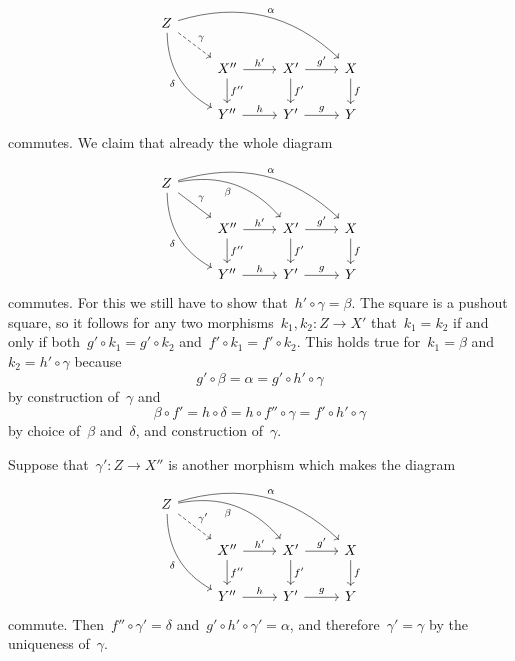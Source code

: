 \[
  \begin{tikzcd}
      Z
      \arrow[bend left]{drrr}[above right]{\alpha}
      \arrow[dashed]{dr}[above right]{\gamma}
      \arrow[bend right]{ddr}[below left]{\delta}
    & {}
    & {}
    & {}
    \\
      {}
    & X''
      \arrow{r}[above]{h'}
      \arrow{d}[right]{f''}
    & X'
      \arrow{r}[above]{g'}
      \arrow{d}[right]{f'}
    & X
      \arrow{d}[right]{f}
    \\
      {}
    & Y''
      \arrow{r}[above]{h}
    & Y'
      \arrow{r}[above]{g}
    & Y
  \end{tikzcd}
\]
commutes.
We claim that already the whole diagram
\[
  \begin{tikzcd}
      Z
      \arrow[bend left]{drrr}[above right]{\alpha}
      \arrow[bend left]{drr}[below left]{\beta}
      \arrow{dr}[above right]{\gamma}
      \arrow[bend right]{ddr}[below left]{\delta}
    & {}
    & {}
    & {}
    \\
      {}
    & X''
      \arrow{r}[above]{h'}
      \arrow{d}[right]{f''}
    & X'
      \arrow{r}[above]{g'}
      \arrow{d}[right]{f'}
    & X
      \arrow{d}[right]{f}
    \\
      {}
    & Y''
      \arrow{r}[above]{h}
    & Y'
      \arrow{r}[above]{g}
    & Y
  \end{tikzcd}
\]
commutes.
For this we still have to show that~$h' \circ \gamma = \beta$.
The  square is a pushout square, so it follows for any two morphisms~$k_1, k_2 \colon Z \to X'$ that~$k_1 = k_2$ if and only if both~$g' \circ k_1 = g' \circ k_2$ and~$f' \circ k_1 = f' \circ k_2$.
This holds true for~$k_1 = \beta$ and~$k_2 = h' \circ \gamma$ because
\[
    g' \circ \beta
  = \alpha
  = g' \circ h' \circ \gamma
\]
by construction of~$\gamma$ and
\[
    \beta \circ f'
  = h \circ \delta
  = h \circ f'' \circ \gamma
  = f' \circ h' \circ \gamma
\]
by choice of~$\beta$ and~$\delta$, and construction of~$\gamma$.

Suppose that~$\gamma' \colon Z \to X''$ is another morphism which makes the diagram
\[
  \begin{tikzcd}
      Z
      \arrow[bend left]{drrr}[above right]{\alpha}
      \arrow[bend left]{drr}[below left]{\beta}
      \arrow[dashed]{dr}[above right]{\gamma'}
      \arrow[bend right]{ddr}[below left]{\delta}
    & {}
    & {}
    & {}
    \\
      {}
    & X''
      \arrow{r}[above]{h'}
      \arrow{d}[right]{f''}
    & X'
      \arrow{r}[above]{g'}
      \arrow{d}[right]{f'}
    & X
      \arrow{d}[right]{f}
    \\
      {}
    & Y''
      \arrow{r}[above]{h}
    & Y'
      \arrow{r}[above]{g}
    & Y
  \end{tikzcd}
\]
commute.
Then~$f'' \circ \gamma' = \delta$ and~$g' \circ h' \circ \gamma' = \alpha$, and therefore~$\gamma' = \gamma$ by the uniqueness of~$\gamma$.





